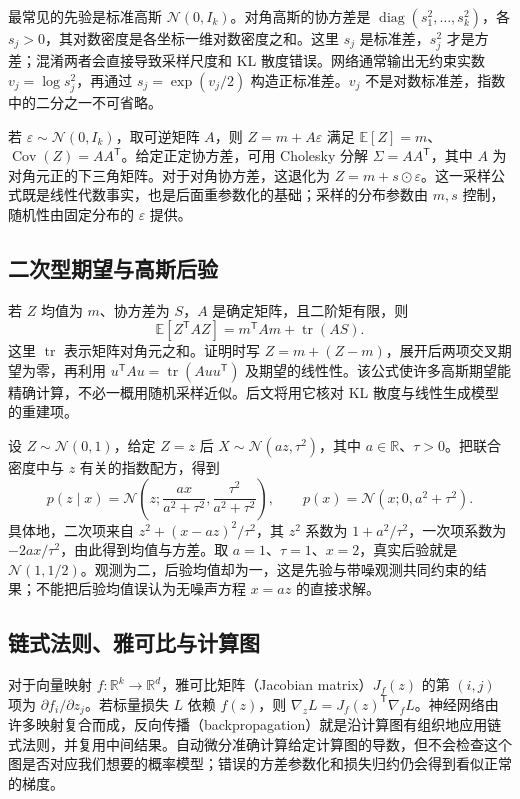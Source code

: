 \documentclass[UTF8,12pt,a4paper,fontset=fandol]{ctexart}
\begin{document}
最常见的先验是标准高斯 $\mathcal N(0,I_k)$。对角高斯的协方差是 $\operatorname{diag}(s_1^2,\ldots,s_k^2)$，各 $s_j>0$，其对数密度是各坐标一维对数密度之和。这里 $s_j$ 是标准差，$s_j^2$ 才是方差；混淆两者会直接导致采样尺度和 KL 散度错误。网络通常输出无约束实数 $v_j=\log s_j^2$，再通过 $s_j=\exp(v_j/2)$ 构造正标准差。$v_j$ 不是对数标准差，指数中的二分之一不可省略。

若 $\varepsilon\sim\mathcal N(0,I_k)$，取可逆矩阵 $A$，则 $Z=m+A\varepsilon$ 满足 $\mathbb E[Z]=m$、$\operatorname{Cov}(Z)=AA^\mathsf T$。给定正定协方差，可用 Cholesky 分解 $\Sigma=AA^\mathsf T$，其中 $A$ 为对角元正的下三角矩阵。对于对角协方差，这退化为 $Z=m+s\odot\varepsilon$。这一采样公式既是线性代数事实，也是后面重参数化的基础；采样的分布参数由 $m,s$ 控制，随机性由固定分布的 $\varepsilon$ 提供。

\subsection{二次型期望与高斯后验}
若 $Z$ 均值为 $m$、协方差为 $S$，$A$ 是确定矩阵，且二阶矩有限，则
\begin{equation}
 \mathbb E[Z^\mathsf T A Z]=m^\mathsf T A m+\operatorname{tr}(AS).
 \label{eq:vae-quadratic}
\end{equation}
这里 $\operatorname{tr}$ 表示矩阵对角元之和。证明时写 $Z=m+(Z-m)$，展开后两项交叉期望为零，再利用 $u^\mathsf TAu=\operatorname{tr}(Auu^\mathsf T)$ 及期望的线性性。该公式使许多高斯期望能精确计算，不必一概用随机采样近似。后文将用它核对 KL 散度与线性生成模型的重建项。

\begin{example}[贯穿全文的一维模型]
\label{ex:vae-linear}
设 $Z\sim\mathcal N(0,1)$，给定 $Z=z$ 后 $X\sim\mathcal N(az,\tau^2)$，其中 $a\in\mathbb R$、$\tau>0$。把联合密度中与 $z$ 有关的指数配方，得到
\begin{equation}
 p(z\mid x)=\mathcal N\!\left(z;\frac{ax}{a^2+\tau^2},
                  \frac{\tau^2}{a^2+\tau^2}\right),\qquad
 p(x)=\mathcal N(x;0,a^2+\tau^2).
 \label{eq:vae-linear-posterior}
\end{equation}
具体地，二次项来自 $z^2+(x-az)^2/\tau^2$，其 $z^2$ 系数为 $1+a^2/\tau^2$，一次项系数为 $-2ax/\tau^2$，由此得到均值与方差。取 $a=1$、$\tau=1$、$x=2$，真实后验就是 $\mathcal N(1,1/2)$。观测为二，后验均值却为一，这是先验与带噪观测共同约束的结果；不能把后验均值误认为无噪声方程 $x=az$ 的直接求解。
\end{example}

\subsection{链式法则、雅可比与计算图}
对于向量映射 $f:\mathbb R^k\to\mathbb R^d$，雅可比矩阵（Jacobian matrix）$J_f(z)$ 的第 $(i,j)$ 项为 $\partial f_i/\partial z_j$。若标量损失 $L$ 依赖 $f(z)$，则 $\nabla_z L=J_f(z)^\mathsf T\nabla_f L$。神经网络由许多映射复合而成，反向传播（backpropagation）就是沿计算图有组织地应用链式法则，并复用中间结果。自动微分准确计算给定计算图的导数，但不会检查这个图是否对应我们想要的概率模型；错误的方差参数化和损失归约仍会得到看似正常的梯度。
\end{document}

